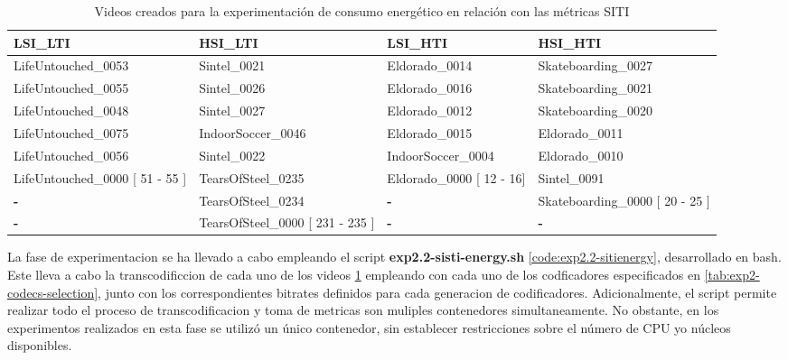 \begin{table}[h!]
 \centering
 \small   %
 \begin{tabularx}{\textwidth}{|>{\centering\arraybackslash}X|>{\centering\arraybackslash}X|>{\centering\arraybackslash}X|>{\centering\arraybackslash}X|}
 \hline
 \rowcolor[HTML]{C0C0C0}
 \textbf{LSI\_LTI} & \textbf{HSI\_LTI} & \textbf{LSI\_HTI} & \textbf{HSI\_HTI} \\
 \hline
 LifeUntouched\_0053                 & Sintel\_0021                         & Eldorado\_0014                & Skateboarding\_0027                 \\ \hline
 LifeUntouched\_0055                 & Sintel\_0026                         & Eldorado\_0016                & Skateboarding\_0021                 \\ \hline
 LifeUntouched\_0048                 & Sintel\_0027                         & Eldorado\_0012                & Skateboarding\_0020                 \\ \hline
 LifeUntouched\_0075                 & IndoorSoccer\_0046                   & Eldorado\_0015                & Eldorado\_0011                      \\ \hline
 LifeUntouched\_0056                 & Sintel\_0022                         & IndoorSoccer\_0004            & Eldorado\_0010                      \\ \hline
 LifeUntouched\_0000 {[} 51 - 55 {]} & TearsOfSteel\_0235                   & Eldorado\_0000 {[} 12 - 16{]} & Sintel\_0091                        \\ \hline
 \textbf{-}                          & TearsOfSteel\_0234                   & \textbf{-}                    & Skateboarding\_0000 {[} 20 - 25 {]} \\ \hline
 \textbf{-}                          & TearsOfSteel\_0000 {[} 231 - 235 {]} & \textbf{-}                    & \textbf{-}                          \\ \hline
 \end{tabularx}
 \caption{Videos creados para la experimentación de consumo energético en relación con las métricas SITI}
 \label{tab:exp2.2-videos}
\end{table}

La fase de experimentacion se ha llevado a cabo empleando el script \textbf{exp2.2-sisti-energy.sh} \ref{code:exp2.2-sitienergy}, desarrollado en bash. Este lleva a cabo la transcodificcion de cada uno de los videos \ref{tab:exp2.2-videos} empleando con cada uno de los codficadores especificados en \ref{tab:exp2-codecs-selection}, junto con los correspondientes bitrates definidos para cada generacion de codificadores. Adicionalmente, el script permite realizar todo el proceso de transcodificacion y toma de metricas son muliples contenedores simultaneamente. No obstante, en los experimentos realizados en esta fase se utilizó un único contenedor, sin establecer restricciones sobre el número de CPU y\/o núcleos disponibles.

